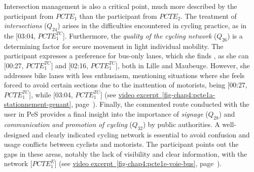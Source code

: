 \begin{refsegment}
Intersection management is also a critical point, much more described by the participant from \(PCTE_{1}\) than the participant from \(PCTE_{2}\). The treatment of \textsl{intersections} (\(Q_{24}\)) arises in the difficulties encountered in cycling practice, as in the  [03:04, \(PCTE^{TC}_{1}\)]. Furthermore, the \textsl{quality of the cycling network} (\(Q_{26}\)) is a determining factor for secure movement in light individual mobility. The participant expresses a preference for bus-only lanes, which she finds , as she can  [00:27, \(PCTE^{TC}_{1}\)] and  [02:16, \(PCTE^{TC}_{1}\)], both in Lille and Maubeuge. However, she addresses bike lanes with less enthusiasm, mentioning situations where she feels forced to avoid certain sections due to the inattention of motorists, being  [00:27, \(PCTE^{TC}_{1}\)], while  [03:04, \(PCTE^{TC}_{1}\)] (see \hyperref[fig-chap4:pcte1a-stationnement-genant]{video excerpt~\ref{fig-chap4:pcte1a-stationnement-genant}}, page~\pageref{fig-chap4:pcte1a-stationnement-genant}). Finally, the commented route conducted with the user in \acrshort{PeS} provides a final insight into the importance of \textsl{signage} (\(Q_{28}\)) and \textsl{communication and promotion of cycling} (\(Q_{32}\)) by public authorities. A well-designed and clearly indicated cycling network is essential to avoid confusion and usage conflicts between cyclists and motorists. The participant points out the gaps in these areas, notably the lack of visibility and clear information, with the network  [\(PCTE^{E}_{1}\)] (see \hyperref[fig-chap4:pcte1e-voie-bus]{video excerpt~\ref{fig-chap4:pcte1e-voie-bus}}, page~\pageref{fig-chap4:pcte1e-voie-bus}).%


\end{refsegment}

